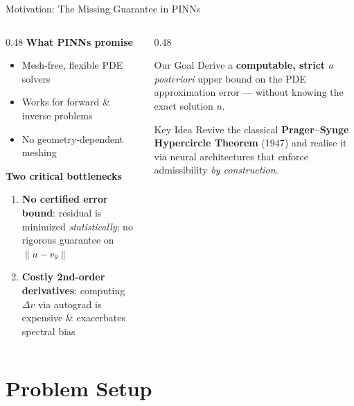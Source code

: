 \documentclass[10pt,aspectratio=169]{beamer}
\begin{document}
\begin{frame}{Motivation: The Missing Guarantee in PINNs}

  \begin{columns}[T]
    \begin{column}{0.48\textwidth}
      \textbf{What PINNs promise}
      \begin{itemize}
        \item Mesh-free, flexible PDE solvers
        \item Works for forward \& inverse problems
        \item No geometry-dependent meshing
      \end{itemize}
      \bigskip
      \textbf{Two critical bottlenecks}
      \begin{enumerate}
        \item \textcolor{red!70!black}{\textbf{No certified error bound}}: residual
              is minimized \emph{statistically}; no
              rigorous guarantee on $\|u - v_{\theta}\|$
        \item \textcolor{red!70!black}{\textbf{Costly 2nd-order derivatives}}:
              computing $\Delta v$ via autograd is
              expensive \& exacerbates spectral bias
      \end{enumerate}
    \end{column}
    \begin{column}{0.48\textwidth}
      \begin{block}{Our Goal}
        Derive a \textbf{computable, strict}
        \emph{a posteriori} upper bound on the
        PDE approximation error — without knowing
        the exact solution $u$.
      \end{block}
      \bigskip
      \begin{block}{Key Idea}
        Revive the classical \textbf{Prager--Synge
        Hypercircle Theorem} (1947) and realise it
        via neural architectures that enforce
        admissibility \emph{by construction}.
      \end{block}
    \end{column}
  \end{columns}
\end{frame}

\section{Problem Setup}
\end{document}
